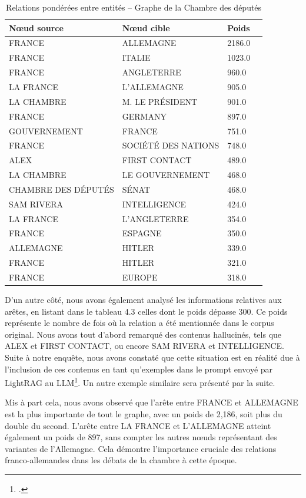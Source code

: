 \documentclass[a4paper,twoside,12pt]{book}
\begin{document}
\begin{table}[ht]
\centering
\begin{tabular}{ll@{\hskip 1cm}ll}
\hline
\textbf{Nœud source} & \textbf{Nœud cible} & \textbf{Poids} \\
\hline
FRANCE & ALLEMAGNE & 2186.0 \\
FRANCE & ITALIE & 1023.0 \\
FRANCE & ANGLETERRE & 960.0 \\
LA FRANCE & L'ALLEMAGNE & 905.0 \\
LA CHAMBRE & M. LE PRÉSIDENT & 901.0 \\
FRANCE & GERMANY & 897.0 \\
GOUVERNEMENT & FRANCE & 751.0 \\
FRANCE & SOCIÉTÉ DES NATIONS & 748.0 \\
ALEX & FIRST CONTACT & 489.0 \\
LA CHAMBRE & LE GOUVERNEMENT & 468.0 \\
CHAMBRE DES DÉPUTÉS & SÉNAT & 468.0 \\
SAM RIVERA & INTELLIGENCE & 424.0 \\
LA FRANCE & L'ANGLETERRE & 354.0 \\
FRANCE & ESPAGNE & 350.0 \\
ALLEMAGNE & HITLER & 339.0 \\
FRANCE & HITLER & 321.0 \\
FRANCE & EUROPE & 318.0 \\
\hline
\end{tabular}
\caption{Relations pondérées entre entités – Graphe de la Chambre des députés}
\label{tab:features_table}
\end{table}

D'un autre côté, nous avons également analysé les informations relatives aux arêtes, en listant dans le tableau 4.3 celles dont le poids dépasse 300. Ce poids représente le nombre de fois où la relation a été mentionnée dans le corpus original. Nous avons tout d'abord remarqué des contenus hallucinés, tels que ALEX et FIRST CONTACT, ou encore SAM RIVERA et INTELLIGENCE. Suite à notre enquête, nous avons constaté que cette situation est en réalité due à l'inclusion de ces contenus en tant qu'exemples dans le prompt envoyé par LightRAG au LLM\footcite{zotero-779}. Un autre exemple similaire sera présenté par la suite.

Mis à part cela, nous avons observé que l'arête entre FRANCE et ALLEMAGNE est la plus importante de tout le graphe, avec un poids de 2,186, soit plus du double du second. L'arête entre LA FRANCE et L'ALLEMAGNE atteint également un poids de 897, sans compter les autres nœuds représentant des variantes de l'Allemagne. Cela démontre l'importance cruciale des relations franco-allemandes dans les débats de la chambre à cette époque.
\end{document}
